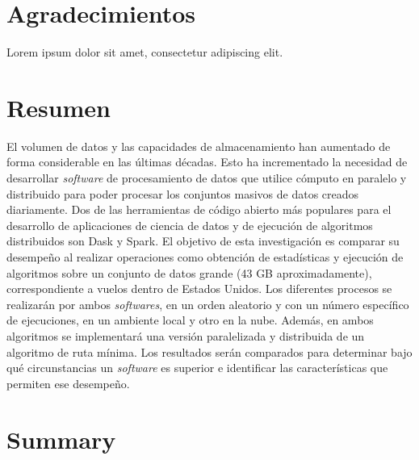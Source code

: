 \documentclass[11pt, oneside]{book}
\begin{document}
\chapter*{Agradecimientos}

\noindent Lorem ipsum dolor sit amet, consectetur adipiscing elit.



\chapter*{Resumen}

\noindent El volumen de datos y las capacidades de almacenamiento han aumentado de forma considerable en las últimas décadas. Esto ha incrementado la necesidad de desarrollar \textit{software} de procesamiento de datos que utilice cómputo en paralelo y distribuido para poder procesar los conjuntos masivos de datos creados diariamente. Dos de las herramientas de código abierto más populares para el desarrollo de aplicaciones de ciencia de datos y de ejecución de algoritmos distribuidos son Dask y Spark. El objetivo de esta investigación es comparar su desempeño al realizar operaciones como obtención de estadísticas y ejecución de algoritmos sobre un conjunto de datos grande (43 GB aproximadamente), correspondiente a vuelos dentro de Estados Unidos. Los diferentes procesos se realizarán por ambos \textit{softwares}, en un orden aleatorio y con un número específico de ejecuciones, en un ambiente local y otro en la nube. Además, en ambos algoritmos se implementará una versión paralelizada y distribuida de un algoritmo de ruta mínima. Los resultados serán comparados para determinar bajo qué circunstancias un \textit{software} es superior e identificar las características que permiten ese desempeño.

\pagestyle{plain}

\noindent 


\chapter*{Summary}
\end{document}
